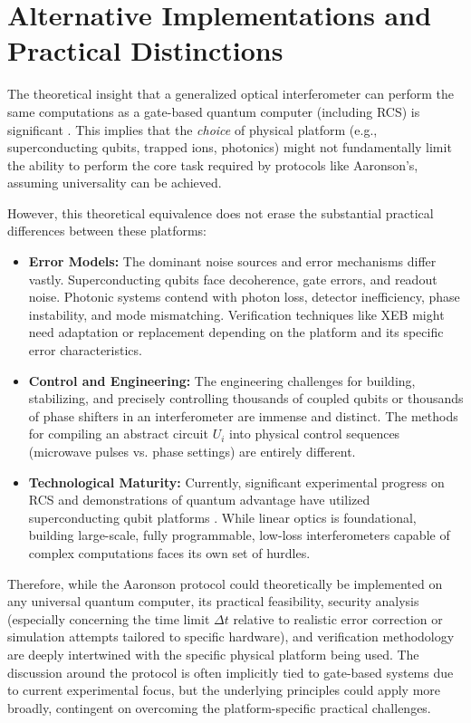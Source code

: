 \documentclass[11pt, a4paper]{article}
\begin{document}
\section{Alternative Implementations and Practical Distinctions}

The theoretical insight that a generalized optical interferometer can perform the same computations as a gate-based quantum computer (including RCS) is significant \cite{ReckZeilinger}. This implies that the \textit{choice}  of physical platform (e.g., superconducting qubits, trapped ions, photonics) might not fundamentally limit the ability to perform the core task required by protocols like Aaronson's, assuming universality can be achieved.

However, this theoretical equivalence does not erase the substantial practical differences between these platforms:

\begin{itemize}
    \item \textbf{Error Models:} The dominant noise sources and error mechanisms differ vastly. Superconducting qubits face decoherence, gate errors, and readout noise. Photonic systems contend with photon loss, detector inefficiency, phase instability, and mode mismatching. Verification techniques like XEB might need adaptation or replacement depending on the platform and its specific error characteristics.
    \item \textbf{Control and Engineering:} The engineering challenges for building, stabilizing, and precisely controlling thousands of coupled qubits or thousands of phase shifters in an interferometer are immense and distinct. The methods for compiling an abstract circuit $U_i$ into physical control sequences (microwave pulses vs. phase settings) are entirely different.
    \item \textbf{Technological Maturity:} Currently, significant experimental progress on RCS and demonstrations of quantum advantage have utilized superconducting qubit platforms \cite{GoogleRCSBlog}. While linear optics is foundational, building large-scale, fully programmable, low-loss interferometers capable of complex computations faces its own set of hurdles.
\end{itemize}

Therefore, while the Aaronson protocol could theoretically be implemented on any universal quantum computer, its practical feasibility, security analysis (especially concerning the time limit $\Delta t$ relative to realistic error correction or simulation attempts tailored to specific hardware), and verification methodology are deeply intertwined with the specific physical platform being used. The discussion around the protocol is often implicitly tied to gate-based systems due to current experimental focus, but the underlying principles could apply more broadly, contingent on overcoming the platform-specific practical challenges.
\end{document}
